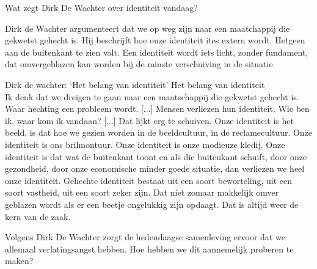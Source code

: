 \documentclass[main.tex]{subfiles}
\begin{document}
\begin{examenvraag}
    \begin{vraag}
        Wat zegt Dirk De Wachter over identiteit vandaag?
    \end{vraag}

    \begin{antwoord}
        Dirk de Wachter argumenteert dat we op weg zijn naar een maatchappij die gekwetst gehecht is.
        Hij beschrijft hoe onze identiteit ites extern wordt. Hetgeen aan de buitenkant te zien valt.
        Een identiteit wordt iets licht, zonder fundament, dat omvergeblazen kan worden bij de minste verschuiving in de situatie.
        \begin{citaat}{Dirk de wachter: `Het belang van identiteit'}
            Het belang van identiteit\\
            Ik denk dat we dreigen te gaan naar een maatschappij die gekwetst gehecht is.
            Waar hechting een probleem wordt.
            [...]
            Mensen verliezen hun identiteit.
            Wie ben ik, waar kom ik vandaan?
            [...]
            Dat lijkt erg te schuiven.
            Onze identiteit is het beeld, is dat hoe we gezien worden in de beeldcultuur, in de reclamecultuur.
            Onze identiteit is ons brilmontuur.
            Onze identiteit is onze modieuze kledij.
            Onze identiteit is dat wat de buitenkant toont en als die buitenkant schuift, door onze gezondheid, door onze economische minder goede situatie, dan verliezen we heel onze identiteit.
            Gehechte identiteit bestaat uit een soort beworteling, uit een soort vastheid, uit een soort zeker zijn.
            Dat niet zomaar makkelijk omver geblazen wordt als er een beetje ongelukkig zijn opdaagt.
            Dat is altijd weer de kern van de zaak.
        \end{citaat}
    \end{antwoord}
\end{examenvraag}


\begin{examenvraag}
    \begin{vraag}
        Volgens Dirk De Wachter zorgt de hedendaagse samenleving ervoor dat we allemaal verlatingsangst hebben. Hoe hebben we dit aannemelijk proberen te maken?
    \end{vraag}

    \begin{antwoord}
    \end{antwoord}
\end{examenvraag}
\end{document}
